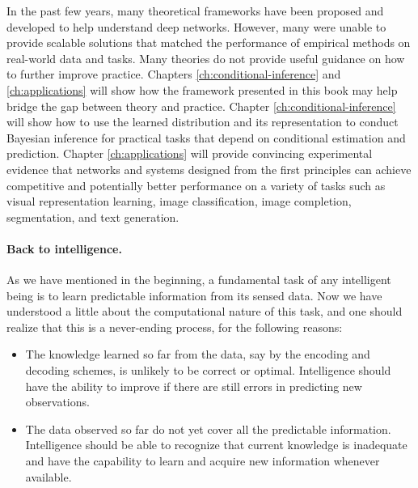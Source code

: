 \documentclass[../../book-main.tex]{subfiles}
\begin{document}
In the past few years, many theoretical frameworks have been proposed and developed to help understand deep networks. However, many were unable to provide scalable solutions that matched the performance of empirical methods on real-world data and tasks. Many theories do not provide useful guidance on how to further improve practice. Chapters \ref{ch:conditional-inference} and  \ref{ch:applications} will show how the framework presented in this book may help bridge the gap between theory and practice. Chapter \ref{ch:conditional-inference} will show how to use the learned distribution and its representation to conduct Bayesian inference for practical tasks that depend on conditional estimation and prediction. Chapter \ref{ch:applications} will provide convincing experimental evidence that networks and systems designed from the first principles can achieve competitive and potentially better performance on a variety of tasks such as visual representation learning,  image classification, image completion, segmentation, and text generation.


\paragraph{Back to intelligence.}
As we have mentioned in the beginning, a fundamental task of any intelligent being is to learn predictable information from its sensed data. Now we have understood a little about the computational nature of this task, and one should realize that this is a never-ending process, for the following reasons:
\begin{itemize}
    \item The knowledge learned so far from the data, say by the encoding and decoding schemes, is unlikely to be correct or optimal. Intelligence should have the ability to improve if there are still errors in predicting new observations. 
    \item The data observed so far do not yet cover all the predictable information. Intelligence should be able to recognize that current knowledge is inadequate and have the capability to learn and acquire new information whenever available.
\end{itemize}
\end{document}
